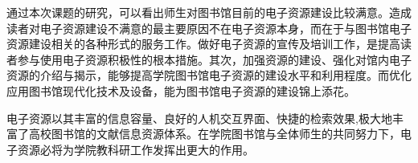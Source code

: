 \thesissummary
    通过本次课题的研究，可以看出师生对图书馆目前的电子资源建设比较满意。造成读者对电子资源建设不满意的最主要原因不在电子资源本身，而在于与图书馆电子资源建设相关的各种形式的服务工作。做好电子资源的宣传及培训工作，是提高读者参与使用电子资源积极性的根本措施。其次，加强资源的建设、强化对馆内电子资源的介绍与揭示，能够提高学院图书馆电子资源的建设水平和利用程度。而优化应用图书馆现代化技术及设备，能为图书馆电子资源的建设锦上添花。

    电子资源以其丰富的信息容量、良好的人机交互界面、快捷的检索效果,极大地丰富了高校图书馆的文献信息资源体系。在学院图书馆与全体师生的共同努力下，电子资源必将为学院教科研工作发挥出更大的作用。
